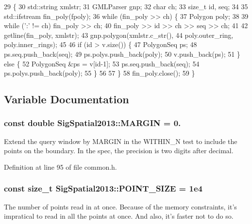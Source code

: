 \begin{DoxyCode}
29     \{
30         std::string xmlstr;
31         GMLParser gnp;
32         \textcolor{keywordtype}{char} ch;
33         \textcolor{keywordtype}{size\_t} id, seq;
34 
35         std::ifstream fin\_poly(fpoly);
36         \textcolor{keywordflow}{while} (fin\_poly >> ch) \{
37             Polygon poly;
38 
39             \textcolor{keywordflow}{while} (\textcolor{charliteral}{':'} != ch) fin\_poly >> ch;
40             fin\_poly >> \textcolor{keywordtype}{id} >> ch >> seq >> ch;
41 
42             getline(fin\_poly, xmlstr);
43             gnp.polygon(xmlstr.c\_str(),
44                         poly.outer\_ring, poly.inner\_rings);
45 
46             \textcolor{keywordflow}{if} (\textcolor{keywordtype}{id} > v.size()) \{
47                 PolygonSeq ps;
48                 ps.seq.push\_back(seq);
49                 ps.polys.push\_back(poly);
50                 v.push\_back(ps);
51             \} \textcolor{keywordflow}{else} \{
52                 PolygonSeq &ps = v[\textcolor{keywordtype}{id}-1];
53                 ps.seq.push\_back(seq);
54                 ps.polys.push\_back(poly);
55             \}
56 
57         \}
58         fin\_poly.close();
59     \}
\end{DoxyCode}


\subsection{Variable Documentation}
\hypertarget{namespaceSigSpatial2013_aea5a48169353413e1f56a7e3f3f70a96}{
\subsubsection[{M\-A\-R\-G\-I\-N}]{\setlength{\rightskip}{0pt plus 5cm}const double Sig\-Spatial2013\-::\-M\-A\-R\-G\-I\-N = 0.}}\label{namespaceSigSpatial2013_aea5a48169353413e1f56a7e3f3f70a96}
Extend the query window by M\-A\-R\-G\-I\-N in the W\-I\-T\-H\-I\-N\-\_\-\-N test to include the points on the boundary. In the spec, the precision is two digits after decimal. 

Definition at line 95 of file common.\-h.

\hypertarget{namespaceSigSpatial2013_a1d63766b99e35a7acbb9e1bffbcc9057}{
\subsubsection[{P\-O\-I\-N\-T\-\_\-\-S\-I\-Z\-E}]{\setlength{\rightskip}{0pt plus 5cm}const size\-\_\-t Sig\-Spatial2013\-::\-P\-O\-I\-N\-T\-\_\-\-S\-I\-Z\-E = 1e4}}\label{namespaceSigSpatial2013_a1d63766b99e35a7acbb9e1bffbcc9057}
The number of points read in at once. Because of the memory constraints, it's impratical to read in all the points at once. And also, it's faster not to do so. 

